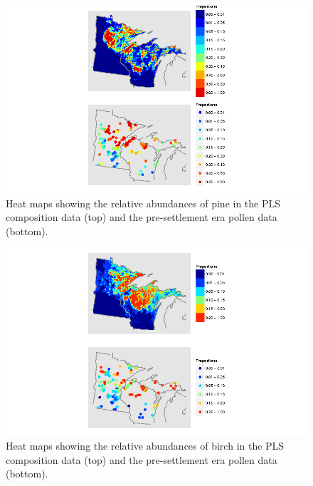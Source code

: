 \begin{figure}
\centering
\includegraphics[width=7in]{figures/maps_compare_PINE.png}
\caption{Heat maps showing the relative abundances of pine in the PLS
  composition data (top) and the pre-settlement era pollen data
  (bottom).}
\label{fig:compare_maps_PINE}
\end{figure}

\begin{figure}
\centering
\includegraphics[width=7in]{figures/maps_compare_BIRCH.png}
\caption{Heat maps showing the relative abundances of birch in the PLS
  composition data (top) and the pre-settlement era pollen data
  (bottom).}
\label{fig:compare_maps_BIRCH}
\end{figure}

